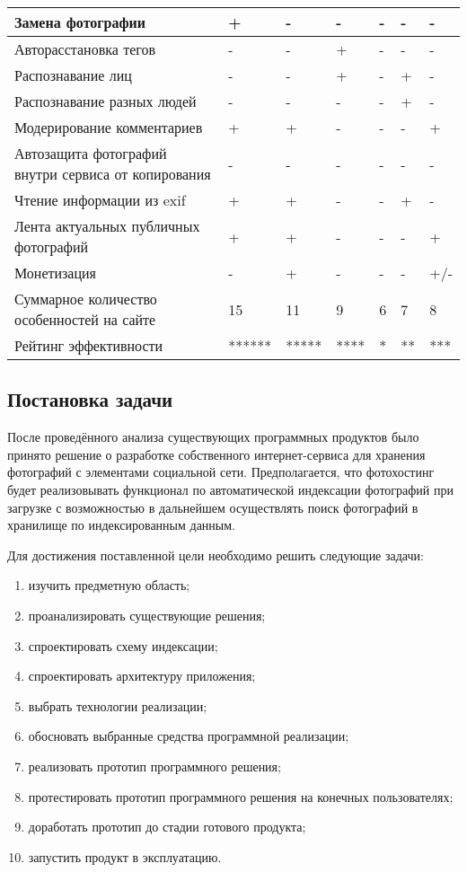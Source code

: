 \begin{landscape}
\begin{table}[H]
\begin{spacing}{1}
\begin{tabular}{|p{5.8cm}|p{2.8cm}|p{2.8cm}|p{2.8cm}|p{2.6cm}|p{2.8cm}|p{2.7cm}|}
  \hline Замена фотографии & + & - & - & - & - & - \\ 
  \hline Авторасстановка тегов & - & - & + & - & - & - \\ 
  \hline Распознавание лиц & - & - & + & - & + & - \\ 
  \hline Распознавание разных людей & - & - & - & - & + & - \\ 
  \hline Модерирование комментариев & + & + & - & - & - & + \\ 
  \hline Автозащита фотографий внутри сервиса от копирования & - & - & - & - & - & - \\ 
  \hline Чтение информации из exif & + & + & - & - & + & - \\ 
  \hline Лента актуальных публичных фотографий & + & + & - & - & - & + \\ 
  \hline Монетизация & - & + & - & - & - & +/- \\ 
  \hline Суммарное количество особенностей на сайте & 15 & 11 & 9 & 6 & 7 & 8 \\ 
  \hline Рейтинг эффективности & ****** & ***** & **** & * & ** & *** \\
  \hline
  \end{tabular}
  \end{spacing}
\end{table}
\end{landscape}

\subsection{Постановка задачи}\label{problem-formulation}
После проведённого анализа существующих программных продуктов было принято решение о разработке собственного интернет-сервиса для хранения фотографий с элементами социальной сети. 
Предполагается, что фотохостинг будет реализовывать функционал по автоматической индексации фотографий при загрузке с возможностью в дальнейшем осуществлять поиск фотографий в хранилище по индексированным данным.

Для достижения поставленной цели необходимо решить следующие задачи:
\begin{enumerate}
    \item изучить предметную область;
    \item проанализировать существующие решения;
    \item спроектировать схему индексации;
    \item спроектировать архитектуру приложения;
    \item выбрать технологии реализации;
    \item обосновать выбранные средства программной реализации;
    \item реализовать прототип программного решения;
    \item протестировать прототип программного решения на конечных пользователях;
    \item доработать прототип до стадии готового продукта;
    \item запустить продукт в эксплуатацию.
\end{enumerate}

